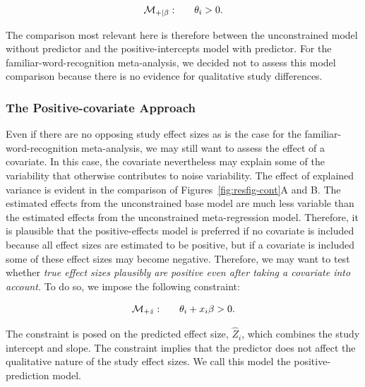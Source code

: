 \documentclass[english,,man]{apa6}
\begin{document}
\[
  \begin{array}{llr}
{\cal M}_{+|\beta}: && \theta_i > 0.\\
\end{array}
\]

The comparison most relevant here is therefore between the unconstrained model without predictor and the positive-intercepts model with predictor. For the familiar-word-recognition meta-analysis, we decided not to assess this model comparison because there is no evidence for qualitative study differences.

\hypertarget{the-positive-covariate-approach}{%
\subsubsection{The Positive-covariate Approach}\label{the-positive-covariate-approach}}

Even if there are no opposing study effect sizes as is the case for the familiar-word-recognition meta-analysis, we may still want to assess the effect of a covariate. In this case, the covariate nevertheless may explain some of the variability that otherwise contributes to noise variability. The effect of explained variance is evident in the comparison of Figures~\ref{fig:resfig-cont}A and B. The estimated effects from the unconstrained base model are much less variable than the estimated effects from the unconstrained meta-regression model. Therefore, it is plausible that the positive-effects model is preferred if no covariate is included because all effect sizes are estimated to be positive, but if a covariate is included some of these effect sizes may become negative. Therefore, we may want to test whether \emph{true effect sizes plausibly are positive even after taking a covariate into account.} To do so, we impose the following constraint:

\[
  \begin{array}{llr}
{\cal M}_{+\hat{z}}: && \theta_i + x_i \beta > 0.\\
\end{array}
\]

The constraint is posed on the predicted effect size, \(\hat{Z}_i\), which combines the study intercept and slope. The constraint implies that the predictor does not affect the qualitative nature of the study effect sizes. We call this model the positive-prediction model.
\end{document}
